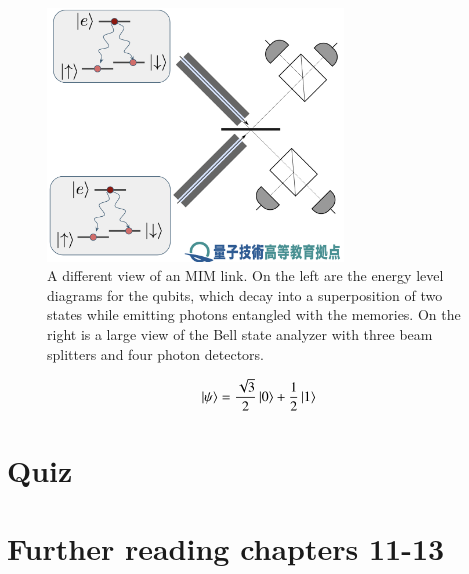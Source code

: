 \begin{figure}[t]
    \centering
    \includegraphics[width=0.7\textwidth]{lesson13/MIM-with-energy-levels.png}
    \caption[MIM with energy levels]{A different view of an MIM link. On the left are the energy level diagrams for the qubits, which decay into a superposition of two states while emitting photons entangled with the memories. On the right is a large view of the Bell state analyzer with three beam splitters and four photon detectors.}
    \label{fig:13-MIM-energy}
\end{figure}




\newpage
\begin{exercises}
\begin{equation*}
\left| \psi \right\rangle = \frac{\sqrt{3}}{2}\left| 0 \right\rangle + \frac{1}{2}\left| 1 \right\rangle
\end{equation*}


\end{exercises}

\newpage
\section*{Quiz}


\section*{Further reading chapters 11-13}

